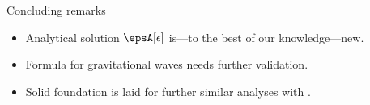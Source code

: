 


\begin{frame}{Concluding remarks}
    \begin{itemize}
        \item Analytical solution $\epsA[\epsilon]$ is---to the best of our knowledge---new. 
        \item Formula for gravitational waves needs further validation. 
        \item Solid foundation is laid for further similar analyses with \asgrd. 
    \end{itemize}
\end{frame}